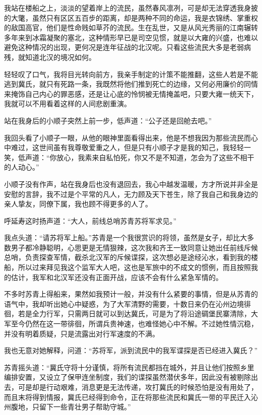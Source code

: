 我站在楼船之上，淡淡的望着岸上的流民，虽然春风凛冽，可是却无法穿透我身披的大氅，虽然只有区区五百步的距离，却是两种不同的命运，我是衣锦绣、掌重权的敌国高官，他们是性命贱如草芥的流民。生在乱世，又是从风光秀丽的江南辗转多年来到冰霜凝聚的塞北，这种情形早已是司空见惯，就是以大雍的兴盛，也难以避免这种情况的出现，更何况是连年征战的北汉呢。只看这些流民大多是老弱病残，就知道北汉的境况如何。

轻轻叹了口气，我将目光转向前方，我亲手制定的计策不能推翻，这些人若是不能逃到冀氏，就只有死路一条，我既然将他们推到死亡的边缘，又何必用廉价的同情来掩饰自己内心的罪恶感，还是让心底的怜悯被无情掩盖吧，只要大雍一统天下，我就可以不用看着这样的人间悲剧重演。

站在我身后的小顺子突然上前一步，低声道：“公子还是回舱去吧。”

我回头看了小顺子一眼，从他的眼神里面看得出来，他是不想我因为那些流民而心中难过，这世间虽有我尊敬爱重之人，但是只有小顺子才是我的知己，我轻轻一笑，低声道：“你放心，我素来自私怕死，你又不是不知道，怎会为了这些不相干的人动心。”

小顺子没有作声，站在我身后也没有退回去，我心中越发温暖，方才所说并非全是安慰的言辞，我不过是个平常的凡人，无力顾及天下苍生，除了我自己和我身边的亲人挚友，同僚下属，我也顾不得更多的人了。

呼延寿这时扬声道：“大人，前线总哨苏青苏将军求见。”

我点头道：“请苏将军上船。”苏青是一个我很赏识的将领，虽然是女子，却比大多数男子都冷静聪明，心思更是无情狠辣，这次我和齐王一致同意让她出任前线斥候总哨，负责探查军情，截杀北汉军的斥候谍探，这次想必是途经沁水，看到我的楼船，所以过来拜见我这个监军大人吧，这也是军旅中的不成文的惯例，而且按照我的估计，我军和北汉军还没有正面开战，应该不会有什么紧急军情的。

不多时苏青上得船来，果然如我预计一般，并没有什么紧要的事情，但是从苏青的语气中，我却听出她心中疑惑，为了大军清野的需要，十数日来仍在沁州边境徘徊，若是全力行军，只需两日就可以到达冀氏，可是为了将沿途碉堡民寨清除，大军至今仍然在这一带徘徊，所谓兵贵神速，也难怪她心中不解。不过她性情沉稳，并没有明着质疑，只是流露出对行军速度的不满。

我也无意对她解释，问道：“苏将军，派到流民中的我军谍探是否已经进入冀氏？”

苏青摇头道：“冀氏守将十分谨慎，将所有流民都挡在城外，并且让他们按照乡里编排安置，又设立了保甲连坐制度，我们的谍探虽然潜伏多年，因此没有被剔除出去，可是却是行动艰难，消息更是无法传递，攻打冀氏的时候恐怕是没有用处了，而且末将得到情报，冀氏已经得到命令，正在将那些流民和冀氏一带的平民迁入沁州腹地，只留下一些青壮男子帮助守城。”

